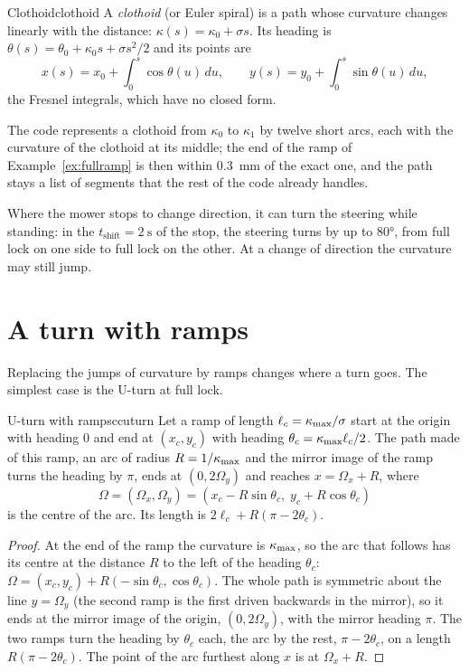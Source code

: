 \begin{definition}{Clothoid}{clothoid}
  A \emph{clothoid} (or Euler spiral) is a path whose curvature changes
  linearly with the distance: $\kappa(s) = \kappa_0 + \sigma s$. Its
  heading is $\theta(s) = \theta_0 + \kappa_0 s + \sigma s^2/2$ and its
  points are
  \[
    x(s) = x_0 + \int_0^s \cos\theta(u)\,du, \qquad
    y(s) = y_0 + \int_0^s \sin\theta(u)\,du,
  \]
  the Fresnel integrals, which have no closed form.
\end{definition}

The code represents a clothoid from $\kappa_0$ to $\kappa_1$ by twelve
short arcs, each with the curvature of the clothoid at its middle; the end
of the ramp of Example~\ref{ex:fullramp} is then within
\SI{0.3}{\milli\metre} of the exact one, and the path stays a list of
segments that the rest of the code already handles.

Where the mower stops to change direction, it can turn the steering while
standing: in the $t_{\mathrm{shift}} = \SI{2}{\second}$ of the stop, the
steering turns by up to $80°$, from full lock on one side to full lock on
the other. At a change of direction the curvature may still jump.

\section{A turn with ramps}

Replacing the jumps of curvature by ramps changes where a turn goes. The
simplest case is the U-turn at full lock.

\begin{proposition}{U-turn with ramps}{ccuturn}
  Let a ramp of length $\ell_c = \kappa_{\max}/\sigma$ start at the origin with
  heading $0$ and end at $(x_c, y_c)$ with heading $\theta_c = \kappa_{\max}
  \ell_c/2$. The path made of this ramp, an arc of radius $R = 1/\kappa_{\max}$
  and the mirror image of the ramp turns the heading by $\pi$, ends at
  $(0, 2\Omega_y)$ and reaches $x = \Omega_x + R$, where
  \[
    \Omega = (\Omega_x, \Omega_y) = (x_c - R\sin\theta_c,\; y_c +
    R\cos\theta_c)
  \]
  is the centre of the arc. Its length is $2\ell_c + R(\pi - 2\theta_c)$.
\end{proposition}

\begin{proof}
  At the end of the ramp the curvature is $\kappa_{\max}$, so the arc that follows
  has its centre at the distance $R$ to the left of the heading $\theta_c$:
  $\Omega = (x_c, y_c) + R(-\sin\theta_c, \cos\theta_c)$. The whole path is
  symmetric about the line $y = \Omega_y$ (the second ramp is the first
  driven backwards in the mirror), so it ends at the mirror image of the
  origin, $(0, 2\Omega_y)$, with the mirror heading $\pi$. The two ramps
  turn the heading by $\theta_c$ each, the arc by the rest, $\pi -
  2\theta_c$, on a length $R(\pi - 2\theta_c)$. The point of the arc
  furthest along $x$ is at $\Omega_x + R$.
\end{proof}

